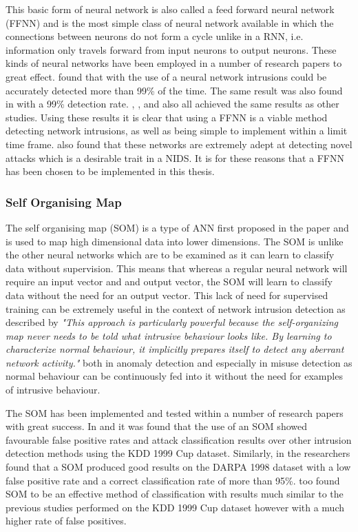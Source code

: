 This basic form of neural network is also called a feed forward neural network (FFNN) and is the most simple class of neural network available in which the connections between neurons do not form a cycle unlike in a RNN, i.e. information only travels forward from input neurons to output neurons.
	These kinds of neural networks have been employed in a number of research papers to great effect. \cite{mukkamala2002intrusion} found that with the use of a neural network intrusions could be accurately detected more than 99\% of the time. The same result was also found in \cite{zhang2001hide} with a 99\% detection rate.
\cite{linda2009neural}, \cite{lee2001training}, and \cite{moradi2004neural} also all achieved the same results as other studies. Using these results it is clear that using a FFNN is a viable method detecting network intrusions, as well as being simple to implement within a limit time frame. \cite{lee2001training} also found that these networks are extremely adept at detecting novel attacks which is a desirable trait in a NIDS. It is for these reasons that a FFNN has been chosen to be implemented in this thesis.

	\subsubsection{Self Organising Map}
	The self organising map (SOM) is a type of ANN first proposed in the paper \cite{kohonen1982self} and is used to map high dimensional data into lower dimensions. The SOM is unlike the other neural networks which are to be examined as it can learn to classify data without supervision. This means that whereas a regular neural network will require an input vector and and output vector, the SOM will learn to classify data without the need for an output vector. This lack of need for supervised training can be extremely useful in the context of network intrusion detection as described by \cite{rhodes2000multiple} \textit{"This approach is particularly powerful because the self-organizing map never needs to be told what intrusive behaviour looks like.  By learning to characterize normal behaviour, it implicitly prepares itself to detect any aberrant network activity."} both in anomaly detection and especially in misuse detection as normal behaviour can be continuously fed into it without the need for examples of intrusive behaviour.
	
	The SOM has been implemented and tested within a number of research papers with great success. In \cite{powers2008hybrid} and \cite{depren2005intelligent} it was found that the use of an SOM showed favourable false positive rates and attack classification results over other intrusion detection methods using the KDD 1999 Cup dataset. Similarly, in \cite{lichodzijewski2002dynamic} the researchers found that a SOM produced good results on the DARPA 1998 dataset with a low false positive rate and a correct classification rate of more than 95\%. \cite{kayacik2003som} too found SOM to be an effective method of classification with results much similar to the previous studies performed on the KDD 1999 Cup dataset however with a much higher rate of false positives.
	
